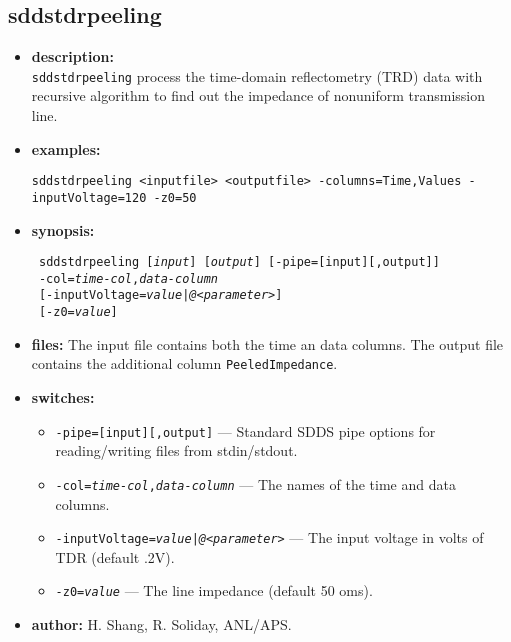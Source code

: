\newpage 
\subsection{sddstdrpeeling} 
\label{sddstdrpeeling} 
 
\begin{itemize} 
\item {\bf description:} \hspace*{1mm}\\ 
{\tt sddstdrpeeling} process the time-domain reflectometry (TRD) data with recursive algorithm to find out the impedance of nonuniform transmission line.
\item {\bf examples:} 
\begin{flushleft}
{\tt sddstdrpeeling <inputfile> <outputfile> -columns=Time,Values -inputVoltage=120 -z0=50 }
\end{flushleft} 
\item {\bf synopsis:}  
\begin{flushleft}
{\tt 
sddstdrpeeling [{\em input}] [{\em output}] [-pipe=[input][,output]] \\ \
-col={\em time-col},{\em data-column} \\ \
{}[-inputVoltage={\em value}|{\em @<parameter>}] \\ \
{}[-z0={\em value}]}
\end{flushleft} 
\item {\bf files:} 
The input file contains both the time an data columns. The output file contains the additional column {\tt PeeledImpedance}.
\item {\bf switches:} 
    \begin{itemize} 
    \item {\tt -pipe=[input][,output]} --- Standard SDDS pipe options for reading/writing files from stdin/stdout.
    \item {\tt -col={\em time-col},{\em data-column}} --- The names of the time and data columns.
    \item {\tt -inputVoltage={\em value}|{\em @<parameter>}} --- The input voltage in volts of TDR (default .2V).
    \item {\tt -z0={\em value}} --- The line impedance (default 50 oms).
\end{itemize} 

\item {\bf author:} H. Shang, R. Soliday, ANL/APS. 
\end{itemize} 
 
